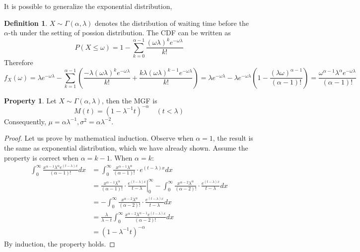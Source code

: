 \documentclass[12pt,a4paper,twoside]{article}
\theoremstyle{definition}
\newtheorem{definition}{Definition}[section]
\newtheorem{property}{Property}[section]
\theoremstyle{remark}
\begin{document}
    It is possible to generalize the exponential distribution,
    \begin{definition}
        $X \sim \Gamma(\alpha, \lambda)$ denotes the distribution of waiting time before the $\alpha$-th under the setting of possion distribution. The CDF can be written as
        \[ P(X \leq \omega) = 1 - \sum_{k=0}^{\alpha-1}\frac{(\omega\lambda)^k e^{-\omega\lambda}}{k!} \]
        Therefore 
        \[ 
            f_X(\omega) = \lambda e^{-\omega\lambda} - \sum_{k=1}^{\alpha-1} \left(\frac{-\lambda(\omega\lambda)^k e^{-\omega\lambda}}{k!} + \frac{k\lambda(\omega\lambda)^{k-1} e^{-\omega\lambda}}{k!}\right) = 
            \lambda e^{-\omega\lambda} - \lambda e^{-\omega\lambda}\left(1-\frac {(\lambda\omega)^{\alpha-1}}{(\alpha - 1)!}\right) = \frac {\omega^{\alpha-1}\lambda^\alpha e^{-\omega\lambda}} {(\alpha - 1)!} 
        \]
    \end{definition}
    \begin{property}
        Let $X \sim \Gamma(\alpha, \lambda)$, then the MGF is 
        \[ M(t) = (1 - \lambda^{-1}t)^{-\alpha} \quad (t < \lambda)\]
        Consequently, $\mu = \alpha\lambda^{-1}, \sigma^2 = \alpha\lambda^{-2}$.
    \end{property}
    \begin{proof} Let us prove by mathematical induction. Observe when $\alpha = 1$, the result is the same as exponential distribution, which we have already shown.
        Assume the property is correct when $\alpha = k - 1$. When $\alpha = k$:
        \begin{align*}
            \int_0^\infty \frac {x^{\alpha-1}\lambda^\alpha e^{(t-\lambda)x}} {(\alpha - 1)!} dx 
            & = \int_0^\infty \frac {x^{\alpha-1}\lambda^\alpha} {(\alpha - 1)!} \cdot e^{(t-\lambda)x} dx \\
            & = \left.\frac {x^{\alpha-1}\lambda^\alpha} {(\alpha - 1)!} \cdot \frac{e^{(t-\lambda)x}}{t-\lambda}\right|_0^\infty 
                    - \int_0^\infty \frac {x^{\alpha-2}\lambda^\alpha} {(\alpha - 2)!} \cdot \frac{e^{(t-\lambda)x}}{t-\lambda} dx \\
            & = - \int_0^\infty \frac {x^{\alpha-2}\lambda^\alpha} {(\alpha - 2)!} \cdot \frac{e^{(t-\lambda)x}}{t-\lambda} dx \\
            & = \frac {\lambda}{\lambda - t} \int_0^\infty \frac {x^{\alpha-2}\lambda^{\alpha-1}e^{(t-\lambda)x}} {(\alpha - 2)!} dx \\
            & = (1 - \lambda^{-1}t)^{-\alpha}
        \end{align*}
        By induction, the property holds.
    \end{proof}
\end{document}
